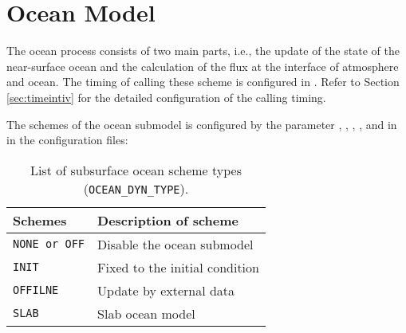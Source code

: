 \section{Ocean Model} \label{sec:basic_usel_ocean}
The ocean process consists of two main parts, i.e., the update of the state of the near-surface ocean and the calculation of the flux at the interface of atmosphere and ocean.
The timing of calling these scheme is configured in . Refer to Section \ref{sec:timeintiv} for the detailed configuration of the calling timing.

The schemes of the ocean submodel is configured by the parameter , , , , and  in  in the configuration files:


\begin{table}[h]
\begin{center}
  \caption{List of subsurface ocean scheme types (\texttt{OCEAN\_DYN\_TYPE}).}
  \label{tab:nml_ocean_dyn}
  \begin{tabularx}{150mm}{lX} \hline
    \rowcolor[gray]{0.9}  Schemes & Description of scheme \\ \hline
      \verb|NONE or OFF| & Disable the ocean submodel \\
      \verb|INIT|        & Fixed to the initial condition \\
      \verb|OFFILNE|     & Update by external data \\
      \verb|SLAB|        & Slab ocean model \\
    \hline
  \end{tabularx}
\end{center}
\end{table}

